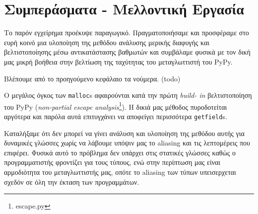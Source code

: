 
\chapter{Συμπεράσματα - Μελλοντική Εργασία}
\label{chapter6} 

Το παρόν εγχείρημα προέκυψε παραγωγικό. Πραγματοποιήσαμε και προσφέραμε στο ευρή
κοινό μια υλοποίηση της μεθόδου ανάλυσης μερικής διαφυγής και βελτιστοποίησης
μέσω αντικατάστασης βαθμωτών και συμβάλαμε φυσικά με τον δική μας μικρή βοήθεια
στην βελτίωση της ταχύτητας του μεταγλωττιστή του PyPy.

Βλέπουμε από το προηγούμενο κεφάλαιο τα νούμερα. (todo)

Ο μεγάλος όγκος των \texttt{malloc}s αφαιρούνται κατά την πρώτη \textit{build-
in} βελτιστοποίηση του PyPy (\textit{non-partial escape
analysis}\footnote{escape.py}). Η δικιά μας μέθοδος πυροδοτείται αργότερα και
παρόλα αυτά επιτυγχάνει να αποφείγει περισσότερα \texttt{getfield}s.

Καταλήξαμε ότι δεν μπορεί να γίνει ανάλυση και υλοποίηση της μεθόδου αυτής για
δυναμικές γλώσσες χωρίς να λάβουμε υπόψιν μας το aliasing και τις λεπτομέρεις
που επιφέρει. Φυσικά αυτό το πρόβλημα δεν υπάρχει στις στατικές γλώσσες καθώς ο
προγραμματιστής φροντίζει για τους τύπους, ενώ στην περίπτωση μας είναι
αρμοδιότητα του μεταγλωττιστής μας, οπότε το aliasing των τύπων υπεισερχεται
σχεδόν σε όλη την έκταση των προγραμμάτων.

